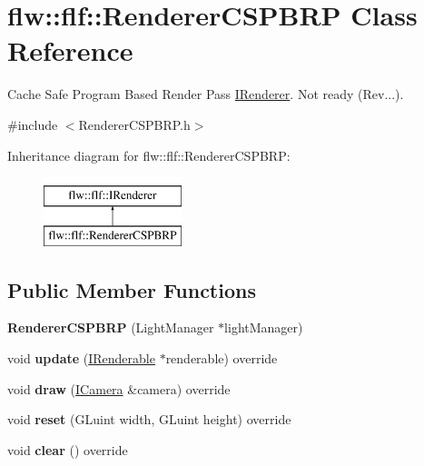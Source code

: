 \hypertarget{classflw_1_1flf_1_1RendererCSPBRP}{}\section{flw\+:\+:flf\+:\+:Renderer\+C\+S\+P\+B\+RP Class Reference}
\label{classflw_1_1flf_1_1RendererCSPBRP}


Cache Safe Program Based Render Pass \hyperlink{classflw_1_1flf_1_1IRenderer}{I\+Renderer}. Not ready (Rev...).  




{\ttfamily \#include $<$Renderer\+C\+S\+P\+B\+R\+P.\+h$>$}

Inheritance diagram for flw\+:\+:flf\+:\+:Renderer\+C\+S\+P\+B\+RP\+:\begin{figure}[H]
\begin{center}
\leavevmode
\includegraphics[height=2.000000cm]{classflw_1_1flf_1_1RendererCSPBRP}
\end{center}
\end{figure}
\subsection*{Public Member Functions}
\begin{DoxyCompactItemize}
\item 
\mbox{\label{classflw_1_1flf_1_1RendererCSPBRP_a97d929f472e8e5c32f5cb05b781af168}} 
{\bfseries Renderer\+C\+S\+P\+B\+RP} (Light\+Manager $\ast$light\+Manager)
\item 
\mbox{\label{classflw_1_1flf_1_1RendererCSPBRP_a3048d852936497f66a5e52ee6da6a7b4}} 
void {\bfseries update} (\hyperlink{classflw_1_1flf_1_1IRenderable}{I\+Renderable} $\ast$renderable) override
\item 
\mbox{\label{classflw_1_1flf_1_1RendererCSPBRP_a8c314e85ecfeeafcb42d0b2802a3db28}} 
void {\bfseries draw} (\hyperlink{classflw_1_1flf_1_1ICamera}{I\+Camera} \&camera) override
\item 
\mbox{\label{classflw_1_1flf_1_1RendererCSPBRP_a6fd6850e484a880e4c77ac41b59fbddc}} 
void {\bfseries reset} (G\+Luint width, G\+Luint height) override
\item 
\mbox{\label{classflw_1_1flf_1_1RendererCSPBRP_acc196eb44bcdb541a360f60d4e9ce7db}} 
void {\bfseries clear} () override
\end{DoxyCompactItemize}

